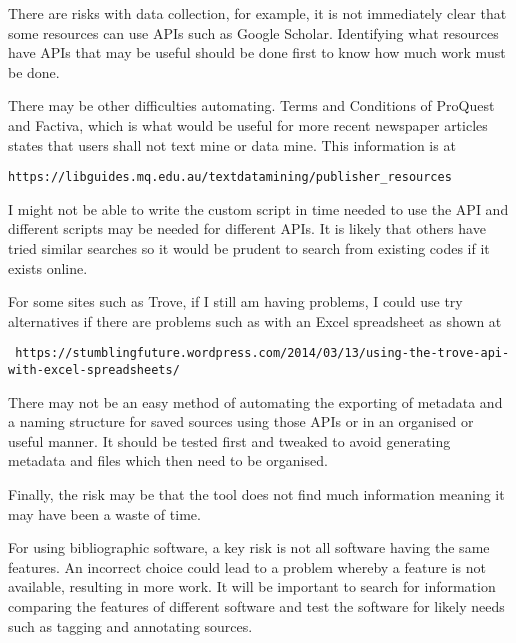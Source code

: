 \documentclass{article}
\begin{document}
There are risks with data collection, for example, it is not immediately clear that some resources can use APIs such as Google Scholar. Identifying what resources have APIs that may be useful should be done first to know how much work must be done.\par
There may be other difficulties automating. Terms and Conditions of ProQuest and Factiva, which is what would be useful for more recent newspaper articles states that users shall not text mine or data mine. This information is at \begin{verbatim}https://libguides.mq.edu.au/textdatamining/publisher_resources\end{verbatim}
I might not be able to write the custom script in time needed to use the API and different scripts may be needed for different APIs. It is likely that others have tried similar searches so it would be prudent to search from existing codes if it exists online.\par
For some sites such as Trove, if I still am having problems, I could use try alternatives if there are problems such as with an Excel spreadsheet as shown at \begin{verbatim} https://stumblingfuture.wordpress.com/2014/03/13/using-the-trove-api-with-excel-spreadsheets/ \end{verbatim}\par

There may not be an easy method of automating the exporting of metadata and a naming structure for saved sources using those APIs or in an organised or useful manner. It should be tested first and tweaked to avoid generating metadata and files which then need to be organised.\par

Finally, the risk may be that the tool does not find much information meaning it may have been a waste of time.\par

For using bibliographic software, a key risk is not all software having the same features. An incorrect choice could lead to a problem whereby a feature is not available, resulting in more work. It will be important to search for information comparing the features of different software and test the software for likely needs such as tagging and annotating sources.\par
\end{document}
